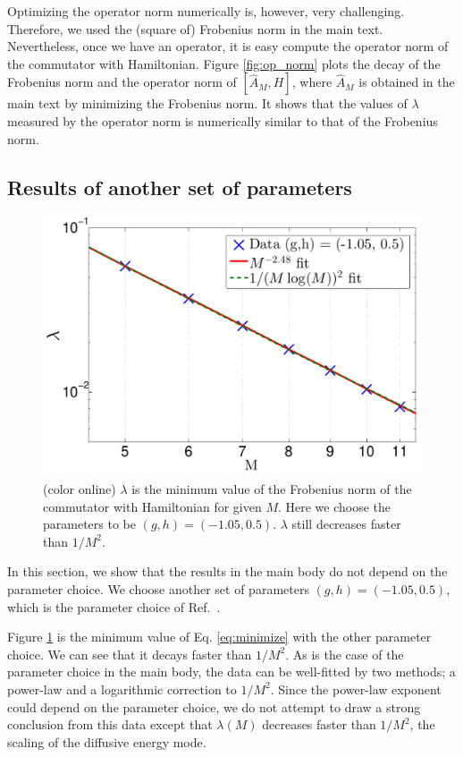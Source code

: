 \documentclass[twocolumn,superscriptaddress, prb]{revtex4-1}
\begin{document}
Optimizing the operator norm numerically is, however, very challenging. Therefore, we used the (square of) Frobenius norm in the main text.
Nevertheless, once we have an operator, it is easy compute the operator norm of the commutator with Hamiltonian.
Figure \ref{fig:op_norm} plots the decay of the Frobenius norm and the operator norm of $[\hat{A}_M,H]$,
where $\hat{A}_M$ is obtained in the main text by minimizing the Frobenius norm.
It shows that the values of $\lambda$ measured by the operator norm is numerically similar to that of the Frobenius norm.


\subsection{Results of another set of parameters}
\begin{figure}
\includegraphics[width=1.0\linewidth]{semi_infinite_full_optimal_other_parameter.pdf}
\centering
\caption{(color online) $\lambda$ is the minimum value of the Frobenius norm of the commutator with Hamiltonian for given $M$.
Here we choose the parameters to be $(g,h) = (-1.05, 0.5)$. $\lambda$ still decreases faster than $1/M^2$. }
\label{fig:full_optimal_other}
\end{figure}
In this section, we show that the results in the main body do not depend on the parameter choice.
We choose another set of parameters $(g,h) = (-1.05, 0.5)$, which is the parameter choice of Ref.~.

Figure \ref{fig:full_optimal_other} is the minimum value of Eq. \eqref{eq:minimize} with the other parameter choice.
We can see that it decays faster than $1/M^2$. As is the case of the parameter choice in the main body,
the data can be well-fitted by two methods; a power-law and a logarithmic correction to $1/M^2$.
Since the power-law exponent could depend on the parameter choice, we do not attempt to draw a strong conclusion from this data
except that $\lambda(M)$ decreases faster than $1/M^2$,
the scaling of the diffusive energy mode.
\end{document}
